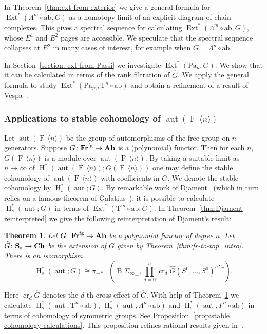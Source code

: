 \documentclass[psamsfonts]{amsart}
\theoremstyle{plain}
\newtheorem{mainthm}{Theorem}
\theoremstyle{definition}
\theoremstyle{remark}
\newcommand{\catname}[1]{{\normalfont\textbf{#1}}}
\newcommand{\spaces}{\catname{S}_*}
\newcommand{\fr}{\allfr^{\mathrm{fg}}}
\newcommand{\allfr}{\catname{Fr}}
\newcommand{\ab}{\catname{Ab}}
\newcommand{\ch}{\catname{Ch}}
\newcommand{\aut}{\operatorname{aut}}
\newcommand{\classifying}{\operatorname{B}}
\newcommand{\free}[1]{\operatorname{F}\,\langle #1\rangle}
\newcommand{\HH}{\operatorname{H}} %
\newcommand{\abelianization}{\mathrm{ab}}
\newcommand{\tensor}{\mathrm{T}}
\newcommand{\Passi}{\mathrm{Pa}}
\DeclareMathOperator{\ext}{Ext}
\DeclareMathOperator{\map}{Map}
\DeclareMathOperator{\pointedmaps}{\map_*}
\DeclareMathOperator{\ce}{cr}
\begin{document}
In Theorem~\ref{thm:ext from exterior} we give a general formula for $\ext^*(\Lambda^m\circ\abelianization, G)$ as a homotopy limit of an explicit diagram of chain complexes. This gives a spectral sequence for calculating $\ext^*(\Lambda^m\circ\abelianization, G)$, whose $E^1$ and $E^2$ pages are accessible. We speculate that the spectral sequence collapses at $E^2$ in many cases of interest, for example when $G=\Lambda^n\circ \abelianization$.


In Section~\ref{section: ext from Passi} we investigate $\ext^*(\Passi_n, G)$. We show that it can be calculated in terms of the rank filtration of $\widehat G$. We apply the general formula to study $\ext^*(\Passi_m, \tensor^n\circ\abelianization)$ and obtain a refinement of a result of Vespa~\cite[Proposition 5]{Vespa2018}.

\subsubsection*{Applications to stable cohomology of $\aut(\free{n})$}
Let $\aut(\free{n})$ be the group of automorphisms of the free group on $n$ generators. Suppose $G\colon \fr\to \ab$ is a (polynomial) functor. Then for each $n$, $G(\free{n})$ is a module over $\aut(\free{n})$. By taking a suitable limit as $n\to \infty$ of $\HH^*(\aut(\free{n}); G(\free{n}))$ one may define the stable cohomology of $\aut(\free{n})$ with coefficients in $G$. We denote the stable cohomology by $\HH^*_s(\aut; G)$. By remarkable work of Djament~\cite{Djament2019} (which in turn relies on a famous theorem of Galatius~\cite{Galatius}), it is possible to calculate $\HH^*_s(\aut; G)$ in terms of $\ext^*(\tensor^m\circ\abelianization,  G)$. In Theorem~\ref{thm:Djament reinterpreted} we give the following reinterpretation of Djament's result:
\begin{mainthm}\label{thm:Djament reinterpreted_intro}
Let $G\colon \fr\to \ab$ be a polynomial functor of degree $n$. Let $\widehat G\colon \spaces\to \ch$ be the extension of $G$ given by Theorem~\ref{thm:fr-to-top_intro}. There is an isomorphism
\[
\HH^*_s(\aut;G)\cong \pi_{-*}\pointedmaps\left({\classifying\Sigma_\infty}_+, \prod_{d=0}^n \ce_d\widehat G(S^0, \ldots, S^0)^{h\Sigma_d}\right).
\]
\end{mainthm}
Here $\ce_d\widehat G$ denotes the $d$-th cross-effect of $\widehat G$. With help of Theorem~\ref{thm:Djament reinterpreted_intro} we calculate $\HH^*_s(\aut, \tensor^n\circ\abelianization)$, $\HH^*_s(\aut, \Lambda^n\circ\abelianization)$ and $\HH^*_s(\aut, \Gamma^n\circ\abelianization)$ in terms of cohomology of symmetric groups. See Proposition~\ref{prop:stable cohomology calculations}. This proposition refines rational results given in~\cite[Theorem 4]{Vespa2018}. 
\end{document}
